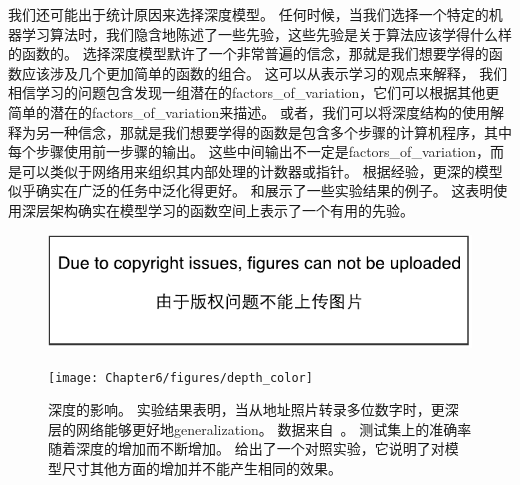 我们还可能出于统计原因来选择深度模型。
任何时候，当我们选择一个特定的机器学习算法时，我们隐含地陈述了一些先验，这些先验是关于算法应该学得什么样的函数的。
选择深度模型默许了一个非常普遍的信念，那就是我们想要学得的函数应该涉及几个更加简单的函数的组合。
这可以从表示学习的观点来解释， 我们相信学习的问题包含发现一组潜在的\gls{factors_of_variation}，它们可以根据其他更简单的潜在的\gls{factors_of_variation}来描述。
或者，我们可以将深度结构的使用解释为另一种信念，那就是我们想要学得的函数是包含多个步骤的计算机程序，其中每个步骤使用前一步骤的输出。
这些中间输出不一定是\gls{factors_of_variation}，而是可以类似于网络用来组织其内部处理的计数器或指针。
根据经验，更深的模型似乎确实在广泛的任务中泛化得更好\citep{Bengio-NIPS2007,Erhan2009,Bengio-2009-book,UTLC+LISA-2011-small,Ciresan-et-al-2012,Krizhevsky-2012-small,sermanet-cvpr-13,Farabet-et-al-2013,couprie-iclr-13,LISA-EmotiW2013,Goodfellow+et+al-ICLR2014a,Szegedy-et-al-arxiv2014}。
和展示了一些实验结果的例子。
这表明使用深层架构确实在模型学习的函数空间上表示了一个有用的先验。
\begin{figure}[!htb]
\ifOpenSource
\centerline{\includegraphics{figure.pdf}}
\else
\centerline{\texttt{[image: Chapter6/figures/depth\_color]}}
\fi
\caption{深度的影响。
实验结果表明，当从地址照片转录多位数字时，更深层的网络能够更好地\gls{generalization}。
数据来自~\cite{Goodfellow+et+al-ICLR2014a}。
测试集上的准确率随着深度的增加而不断增加。
给出了一个对照实验，它说明了对模型尺寸其他方面的增加并不能产生相同的效果。}
\label{fig:chap6_depth_color}
\end{figure}

